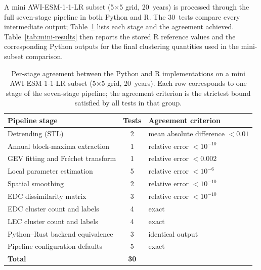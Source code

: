 \documentclass[preprint,12pt,a4paper]{elsarticle}
\begin{document}
{A mini AWI-ESM-1-1-LR subset (5$\times$5 grid, 20~years) is
processed through the full seven-stage pipeline in both
Python and R. The 30~tests compare every intermediate output;
Table~\ref{tab:pipeline-parity} lists each stage and the
agreement achieved. Table~\ref{tab:mini-results} then reports the
stored R reference values and the corresponding Python outputs for
the final clustering quantities used in the mini-subset comparison.

\begin{table}[!htbp]
\centering
\small
\setlength{\tabcolsep}{5pt}
\begin{tabularx}{\textwidth}{>{\raggedright\arraybackslash}p{4.2cm}c>{\raggedright\arraybackslash}X}
\toprule
\textbf{Pipeline stage} & \textbf{Tests} &
  \textbf{Agreement criterion} \\
\midrule
Detrending (STL) & 2 &
  mean absolute difference $< 0.01$ \\
Annual block-maxima extraction & 1 &
  relative error $< 10^{-10}$ \\
GEV fitting and Fr\'{e}chet transform & 1 &
  relative error $< 0.002$ \\
Local parameter estimation & 5 &
  relative error $< 10^{-6}$ \\
Spatial smoothing & 2 &
  relative error $< 10^{-10}$ \\
EDC dissimilarity matrix & 3 &
  relative error $< 10^{-10}$ \\
EDC cluster count and labels & 4 &
  exact \\
LEC cluster count and labels & 4 &
  exact \\
Python--Rust backend equivalence & 3 &
  identical output \\
Pipeline configuration defaults & 5 &
  exact \\
\midrule
\textbf{Total} & \textbf{30} & \\
\bottomrule
\end{tabularx}
\caption{Per-stage agreement between the Python and R
  implementations on a mini AWI-ESM-1-1-LR subset
  (5$\times$5 grid, 20~years). Each row corresponds to one
  stage of the seven-stage pipeline; the agreement criterion
  is the strictest bound satisfied by all tests in that group.}
\label{tab:pipeline-parity}
\end{table}

}
\end{document}
